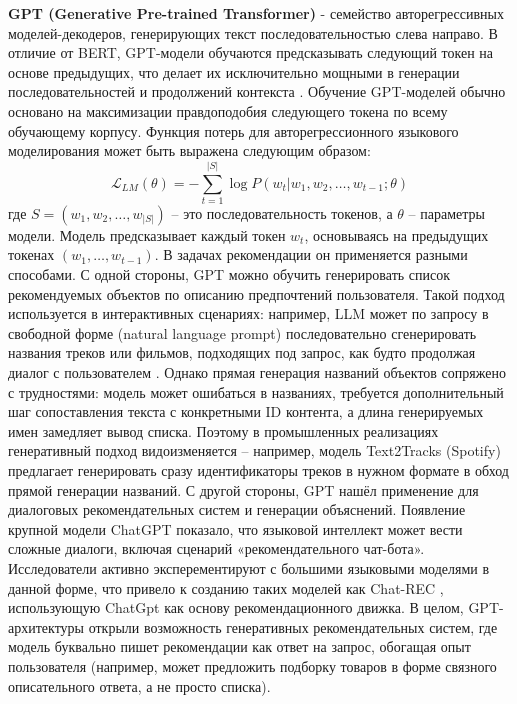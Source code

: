 \textbf{GPT (Generative Pre-trained Transformer)} - семейство авторегрессивных моделей-декодеров, генерирующих текст последовательностью слева направо. В отличие от BERT, GPT-модели обучаются предсказывать следующий токен на основе предыдущих, что делает их исключительно мощными в генерации последовательностей и продолжений контекста \citep{zhao2024recommendersystemsin}. Обучение GPT-моделей обычно основано на максимизации правдоподобия следующего токена по всему обучающему корпусу. Функция потерь для авторегрессионного языкового моделирования может быть выражена следующим образом:
\[ \mathcal{L}_{LM}(\theta) = - \sum_{t=1}^{|S|} \log P(w_t | w_1, w_2, \dots, w_{t-1}; \theta) \]
где \(S = (w_1, w_2, \dots, w_{|S|})\) – это последовательность токенов, а \(\theta\) – параметры модели. Модель предсказывает каждый токен \(w_t\), основываясь на предыдущих токенах \((w_1, \dots, w_{t-1})\).
В задачах рекомендации он применяется разными способами. С одной стороны, GPT можно обучить генерировать список рекомендуемых объектов по описанию предпочтений пользователя. Такой подход используется в интерактивных сценариях: например, LLM может по запросу в свободной форме (natural language prompt) последовательно сгенерировать названия треков или фильмов, подходящих под запрос, как будто продолжая диалог с пользователем \citep{palumbo2025text2trackspromptbasedmusicrecommendation}. Однако прямая генерация названий объектов сопряжено с трудностями: модель может ошибаться в названиях, требуется дополнительный шаг сопоставления текста с конкретными ID контента, а длина генерируемых имен замедляет вывод списка. Поэтому в промышленных реализациях генеративный подход видоизменяется – например, модель Text2Tracks (Spotify) предлагает генерировать сразу идентификаторы треков в нужном формате в обход прямой генерации названий. С другой стороны, GPT нашёл применение для диалоговых рекомендательных систем и генерации объяснений. Появление крупной модели ChatGPT показало, что языковой интеллект может вести сложные диалоги, включая сценарий «рекомендательного чат-бота». Исследователи активно эксперементируют с большими языковыми моделями в данной форме, что привело к созданию таких моделей как Chat-REC \citep{gao2023chatrec}, использующую ChatGpt как основу рекомендационного движка. В целом, GPT-архитектуры открыли возможность генеративных рекомендательных систем, где модель буквально пишет рекомендации как ответ на запрос, обогащая опыт пользователя (например, может предложить подборку товаров в форме связного описательного ответа, а не просто списка). 

